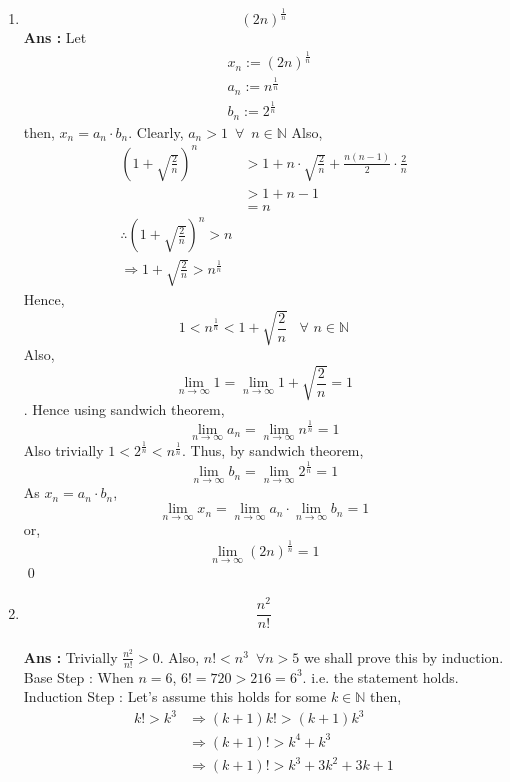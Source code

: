\documentclass[10pt]{article}
\newcommand{\nn}{\mathbb{N}}
\newcommand{\inflim}{\lim_{n\to\infty}}
\newcommand{\sol}{\textbf{Ans : }}
\begin{document}
        \begin{enumerate}[label={(\roman*)}]
        \item $$(2n)^\frac{1}{n}$$
        \sol Let
        \begin{align*}
            &x_n := (2n)^\frac{1}{n}\\
            &a_n := n^\frac{1}{n}\\
            &b_n := 2^\frac{1}{n}
        \end{align*}
        then, $x_n = a_n\cdot b_n$. Clearly, $a_n > 1 \,\,\,\forall \,\,\,n \in \nn$
        Also, 
        \begin{align*}
            \left(1 + \sqrt{\frac{2}{n}}\right)^n
            &> 1 + n\cdot \sqrt{\frac{2}{n}} + \frac{n(n-1)}{2} \cdot \frac{2}{n}\\
            &> 1 + n - 1\\
            & = n\\
            \therefore \left(1 + \sqrt{\frac{2}{n}}\right)^n > n \\ \Rightarrow 1 + \sqrt{\frac{2}{n}} > n^\frac{1}{n}
        \end{align*}
        Hence, 
        $$1 < n^\frac{1}{n} < 1 + \sqrt{\frac{2}{n}} \,\,\,\,\,\forall \,\, n \in \nn$$
        Also, $$\inflim 1 = \inflim  1 + \sqrt{\frac{2}{n}} = 1$$. Hence using sandwich theorem, 
        $$\inflim a_n=\inflim n^\frac{1}{n} = 1$$
        Also  trivially $1 < 2^\frac{1}{n}< n^\frac{1}{n}$. Thus, by sandwich theorem, $$\inflim b_n = \inflim 2^\frac{1}{n} = 1$$
        As $x_n = a_n \cdot b_n$, 
        $$\inflim x_n = \inflim a_n \cdot \inflim b_n = 1$$ or,
        $$\inflim (2n)^\frac{1}{n} = 1$$\qed \\
        \item $$\frac{n^2}{n!}$$ \\
        \sol Trivially $\frac{n^2}{n!} > 0$. Also, $n! < n^3 \,\,\, \forall n > 5$ we shall prove this by induction. \\
        Base Step :  When $n = 6$, $6! = 720 > 216 = 6^3$. i.e. the statement holds.\\
        Induction Step : Let's assume this holds for some $k \in \nn$ then, 
        \begin{align*}
            k! > k^3 &\Rightarrow (k+1)k! > (k+1)k^3\\
            &\Rightarrow (k+1)! > k^4 + k^3\\
            &\Rightarrow (k+1)! > k^3 + 3k^2 + 3k + 1 \tag{$k \geq 7 \Rightarrow k^4 > 7k^3 = 3k^3 + 3k^3 + k^3 > 3k^2 + 3k + 1$}\\

\end{align*}
\end{enumerate}
\end{document}
